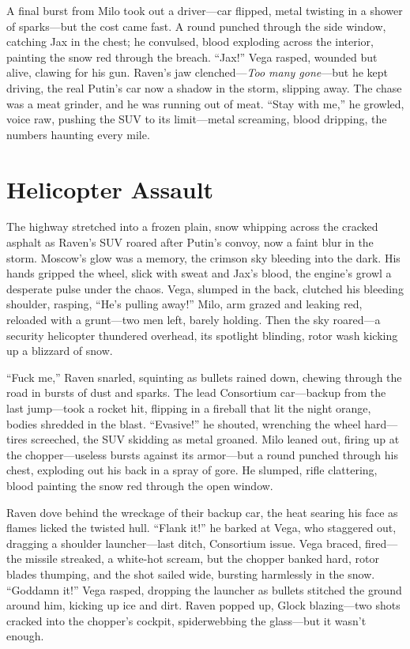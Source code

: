 \documentclass[12pt]{book}
\begin{document}
A final burst from Milo took out a driver—car flipped, metal twisting in a shower of sparks—but the cost came fast. A round punched through the side window, catching Jax in the chest; he convulsed, blood exploding across the interior, painting the snow red through the breach. “Jax!” Vega rasped, wounded but alive, clawing for his gun. Raven’s jaw clenched—\textit{Too many gone}—but he kept driving, the real Putin’s car now a shadow in the storm, slipping away. The chase was a meat grinder, and he was running out of meat. “Stay with me,” he growled, voice raw, pushing the SUV to its limit—metal screaming, blood dripping, the numbers haunting every mile.


\section{Helicopter Assault}

The highway stretched into a frozen plain, snow whipping across the cracked asphalt as Raven’s SUV roared after Putin’s convoy, now a faint blur in the storm. Moscow’s glow was a memory, the crimson sky bleeding into the dark. His hands gripped the wheel, slick with sweat and Jax’s blood, the engine’s growl a desperate pulse under the chaos. Vega, slumped in the back, clutched his bleeding shoulder, rasping, “He’s pulling away!” Milo, arm grazed and leaking red, reloaded with a grunt—two men left, barely holding. Then the sky roared—a security helicopter thundered overhead, its spotlight blinding, rotor wash kicking up a blizzard of snow.

“Fuck me,” Raven snarled, squinting as bullets rained down, chewing through the road in bursts of dust and sparks. The lead Consortium car—backup from the last jump—took a rocket hit, flipping in a fireball that lit the night orange, bodies shredded in the blast. “Evasive!” he shouted, wrenching the wheel hard—tires screeched, the SUV skidding as metal groaned. Milo leaned out, firing up at the chopper—useless bursts against its armor—but a round punched through his chest, exploding out his back in a spray of gore. He slumped, rifle clattering, blood painting the snow red through the open window.

Raven dove behind the wreckage of their backup car, the heat searing his face as flames licked the twisted hull. “Flank it!” he barked at Vega, who staggered out, dragging a shoulder launcher—last ditch, Consortium issue. Vega braced, fired—the missile streaked, a white-hot scream, but the chopper banked hard, rotor blades thumping, and the shot sailed wide, bursting harmlessly in the snow. “Goddamn it!” Vega rasped, dropping the launcher as bullets stitched the ground around him, kicking up ice and dirt. Raven popped up, Glock blazing—two shots cracked into the chopper’s cockpit, spiderwebbing the glass—but it wasn’t enough.
\end{document}
